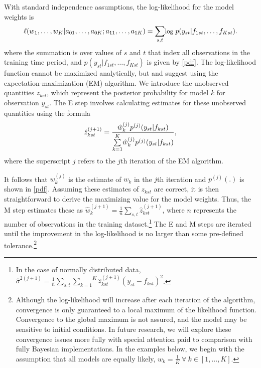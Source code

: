 \documentclass[12pt,fullpage]{article}
\newcommand{\note}[1]{\footnote{\doublespacing#1 \vspace{4 mm}}}
\begin{document}
With standard independence assumptions, the log-likelihood for the
model weights is
\begin{equation}
\small
  \ell (w_1, \ldots, w_K | a_{01},  \ldots, a_{0K}; a_{11},
  \ldots, a_{1K})= \underset{s,t}{\sum}\mbox{log }p(y_{st} |
  f_{1st}, \ldots, f_{Kst}).
\end{equation}
\noindent where the summation is over values of $s$ and $t$ that index
all observations in the training time period, and $p(y_{st}|f_{1st},
\ldots, f_{Kst}) $ is given by \eqref{pdf}. The log-likelihood
function cannot be maximized analytically, but \citet{Raftery:2005}
and \citet{Sloughter:2007} suggest using the expectation-maximization
(EM) algorithm.  We introduce the unobserved quantities $z_{kst}$,
which represent the posterior probability for model $k$ for
observation $y_{st}$.  The E step involves calculating estimates for
these unobserved quantities using the formula
\begin{equation}
\small
\hat{z}^{(j+1)}_{kst} = \frac{\hat{w}^{(j)}_k
p^{(j)}(y_{st}|f_{kst})}{\overset{K}{\underset{k=1}{\sum}}\hat{w}^{(j)}_kp^{(j)}(y_{st}|f_{kst})},
\end{equation}
\noindent where the superscript $j$ refers to the $j$th iteration of
the EM algorithm.

It follows that $w_k^{(j)}$ is the estimate of $w_k$ in the $j$th
iteration and $p^{(j)}(.)$ is shown in \eqref{pdf}.  Assuming these
estimates of $z_{kst}$ are correct, it is then straightforward to
derive the maximizing value for the model weights. Thus, the M step
estimates these as
$\hat{w}^{(j+1)}_k=\frac{1}{n}\underset{s,t}{\sum}\hat{z}^{(j+1)}_{kst}$,
where $n$ represents the number of observations in the training
dataset.\note{In the case of normally distributed data,
  $\hat{\sigma}^{2(j+1)}=\frac{1}{n}\underset{s,t}{\sum}\overset{K}{\underset{k=1}{\sum}}\hat{z}^{(j+1)}_{kst}(y_{st}-f_{kst})^2$.}
The E and M steps are iterated until the improvement in the
log-likelihood is no larger than some pre-defined
tolerance.\note{Although the log-likelihood will increase after each
  iteration of the algorithm, convergence is only guaranteed to a
  local maximum of the likelihood function.  Convergence to the global
  maximum is not assured, and the model may be sensitive to initial
  conditions. In future research, we will explore these convergence
  issues more fully with special attention paid to comparison with
  fully Bayesian implementations. In the examples below, we begin with
  the assumption that all models are equally likely, $w_k =
  \frac{1}{K} ~ \forall ~ k \in [1, \ldots, K]$.}
\end{document}
